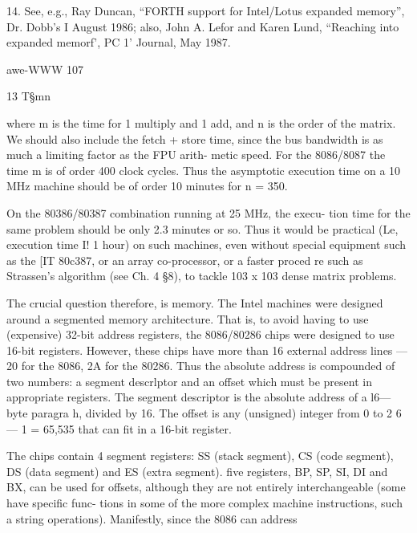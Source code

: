 { 
   
 
 
  
   
 
  
 
 
  

 

14. See, e.g., Ray Duncan, “FORTH support for Intel/Lotus expanded memory”, Dr. Dobb's I
August 1986; also, John A. Lefor and Karen Lund, “Reaching into expanded memorf', PC 1'
Journal, May 1987.

awe-WWW 107

13
T§mn

where m is the time for 1 multiply and 1 add, and n is the order
of the matrix. We should also include the fetch + store time, since
the bus bandwidth is as much a limiting factor as the FPU arith-
metic speed. For the 8086/8087 the time m is of order 400 clock
cycles. Thus the asymptotic execution time on a 10 MHz machine
should be of order 10 minutes for n = 350.

On the 80386/80387 combination running at 25 MHz, the execu-
tion time for the same problem should be only 2.3 minutes or so.
Thus it would be practical (Le, execution time I! 1 hour) on such
machines, even without special equipment such as the [IT 80c387,
or an array co-processor, or a faster proced re such as Strassen’s
algorithm (see Ch. 4 §8), to tackle 103 x 103 dense matrix
problems.

The crucial question therefore, is memory. The Intel machines
were designed around a segmented memory architecture. That is,
to avoid having to use (expensive) 32-bit address registers, the
8086/80286 chips were designed to use 16-bit registers. However,
these chips have more than 16 external address lines — 20 for the
8086, 2A for the 80286. Thus the absolute address is compounded
of two numbers: a segment descrlptor and an offset which
must be present in appropriate registers. The segment descriptor
is the absolute address of a l6—byte paragra h, divided by 16.
The offset is any (unsigned) integer from 0 to 2 6— 1 = 65,535 that
can fit in a 16-bit register.

The chips contain 4 segment registers: SS (stack segment), CS
(code segment), DS (data segment) and ES (extra segment). five
registers, BP, SP, SI, DI and BX, can be used for offsets, although
they are not entirely interchangeable (some have specific func-
tions in some of the more complex machine instructions, such a
string operations). Manifestly, since the 8086 can address

}
